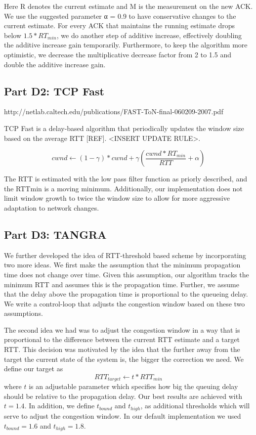 \documentclass[12pt]{article}
\begin{document}
Here R denotes the current estimate and M is the measurement on the new ACK. We
use the suggested parameter α = 0.9 to have conservative changes to the current
estimate. For every ACK that maintains the running estimate drops below
$1.5*RT_{min}$, we do another step of additive increase, effectively doubling
the additive increase gain temporarily. Furthermore, to keep the algorithm more
optimistic, we decrease the multiplicative decrease factor from 2 to 1.5 and
double the additive increase gain.

\subsection*{Part D2: TCP Fast}

http://netlab.caltech.edu/publications/FAST-ToN-final-060209-2007.pdf

TCP Fast is a delay-based algorithm that periodically updates the window size
based on the average RTT [REF]. <INSERT UPDATE RULE>.

$$cwnd \leftarrow (1 - \gamma)* cwnd + \gamma \left(\frac{cwnd * {RT_{min}}}{RTT} + \alpha \right)$$

The RTT is estimated with the low pass filter function as priorly described, and
the RTTmin is a moving minimum. Additionally, our implementation does not limit
window growth to twice the window size to allow for more aggressive adaptation
to network changes. 

\subsection*{Part D3: TANGRA}

We further developed the idea of RTT-threshold based scheme by incorporating two
more ideas. We first make the assumption that the minimum propagation time does
not change over time. Given this assumption, our algorithm tracks the minimum
RTT and assumes this is the propagation time. Further, we assume that the delay
above the propagation time is proportional to the queueing delay. We write a
control-loop that adjusts the congestion window based on these two assumptions.

The second idea we had was to adjust the congestion window in a way that is
proportional to the difference between the current RTT estimate and a target
RTT. This decision was motivated by the idea that the further away from the
target the current state of the system is, the bigger the correction we need. We
define our target as
$$RTT_{target} \leftarrow t * {RTT}_{min}$$
where $t$ is an adjustable parameter which specifies how big the queuing delay
should be relative to the propagation delay. Our best results are achieved with
$t = 1.4$. In addition, we define $t_{bound}$ and $t_{high}$, as additional
thresholds which will serve to adjust the congestion window. In our default
implementation we used $t_{bound} = 1.6$ and $t_{high} = 1.8$.
\end{document}
